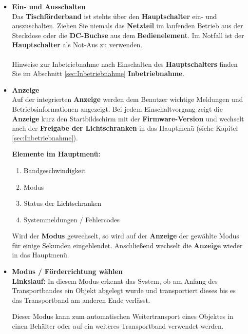 \begin{itemize}
	\item \textbf{Ein- und Ausschalten} \\
	Das \textbf{Tischförderband} ist stehts über den \textbf{Hauptschalter} ein- und auszuschalten. Ziehen Sie niemals das \textbf{Netzteil} im laufenden Betrieb aus der Steckdose oder die \textbf{DC-Buchse} aus dem \textbf{Bedienelement}.
	Im Notfall ist der \textbf{Hauptschalter} als Not-Aus zu verwenden.\\
	\\
	Hinweise zur Inbetriebnahme nach Einschalten des \textbf{Hauptschalters} finden Sie im Abschnitt \ref{sec:Inbetriebnahme}  \textbf{Inbetriebnahme}.
	
	\item \textbf{Anzeige} \\
	Auf der integrierten \textbf{Anzeige} werden dem Benutzer wichtige Meldungen und Betriebsinformationen angezeigt. 
	Bei jedem Einschaltvorgang zeigt die \textbf{Anzeige} kurz den Startbildschirm mit der \textbf{Firmware-Version} und wechselt nach der \textbf{Freigabe der Lichtschranken} in das Hauptmenü (siehe Kapitel \ref{sec:Inbetriebnahme}). 
	
	\textbf{Elemente im Hauptmenü:}
	\begin{enumerate}
		\item Bandgeschwindigkeit
		\item Modus
		\item Status der Lichtschranken
		\item Systemmeldungen / Fehlercodes
		
	\end{enumerate}
	
	Wird der \textbf{Modus} gewechselt, so wird auf der \textbf{Anzeige} der gewählte Modus für einige Sekunden eingeblendet.
	Anschließend wechselt die \textbf{Anzeige} wieder in das Hauptmenü.
	  
	  
	  
	  
	\item \textbf{Modus / Förderrichtung wählen} \\  
		
		\textbf{Linkslauf:}
		In diesem Modus erkennt das System, ob am Anfang des Transportbandes ein Objekt abgelegt wurde und transportiert dieses bis es das Transportband am anderen Ende verlässt.
			
		Dieser Modus kann zum automatischen Weitertransport eines Objektes in einen Behälter oder auf ein weiteres Transportband verwendet werden.
			

\end{itemize}
